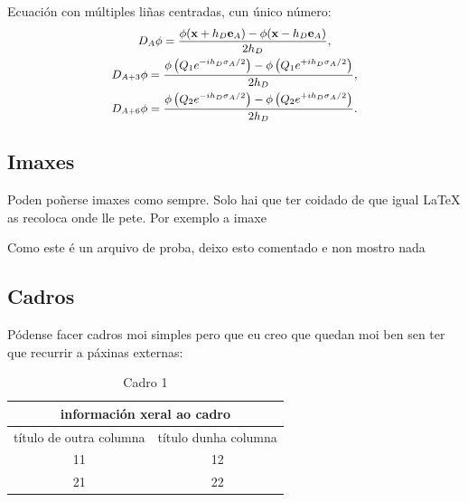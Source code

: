 Ecuación con múltiples liñas centradas, cun único número:
\begin{equation}\small
    \begin{gathered} %
        D_{A}\phi = \frac{\phi(\textbf{x} + h_D \textbf{e}_A) - \phi(\textbf{x} - h_D \textbf{e}_A)}{2 h_D}, \\
        D_{A+3} \phi = \frac{\phi\left(Q_1 e^{-i h_D \sigma_A/2}\right) - \phi\left(Q_1 e^{+i h_D \sigma_A/2}\right)}{2 h_D}, \\
        D_{A+6} \phi = \frac{\phi\left(Q_2 e^{-i h_D \sigma_A/2}\right) - \phi\left(Q_2 e^{+i h_D \sigma_A/2}\right)}{2 h_D}.
        \label{eq:D_A}
    \end{gathered}
\end{equation}

\subsection*{Imaxes} %

Poden poñerse imaxes como sempre. Solo hai que ter coidado de que igual \LaTeX
as recoloca onde lle pete. Por exemplo a imaxe%

Como este é un arquivo de proba, deixo esto comentado e non mostro nada


\subsection*{Cadros} %

Pódense facer cadros moi simples pero que eu creo que quedan moi ben sen ter
que recurrir a páxinas externas:

\begin{table}[h!]
    \centering
    \begin{tabular}{cc} %
        \toprule
        \midrule
        \multicolumn{2}{c}{información xeral ao cadro} \\ %
        \midrule
        {título de outra columna} & {título dunha columna} \\
        \midrule
        \toprule

        {11} & {12} \\
        \midrule
        {21} & {22} \\

        \midrule
        \bottomrule
    \end{tabular}
    \caption{Cadro 1}
    \label{Tab:cadro1}
\end{table}

